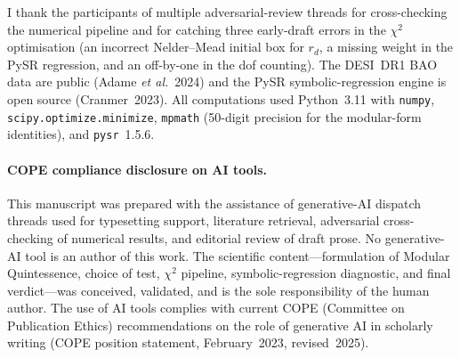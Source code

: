 \documentclass[11pt,letterpaper,twoside]{article}
\newcommand{\rd}{r_{d}}
\begin{document}
I thank the participants of multiple adversarial-review threads for cross-checking
the numerical pipeline and for catching three early-draft errors in the
$\chi^{2}$ optimisation (an incorrect Nelder--Mead initial box for $\rd$,
a missing weight in the PySR regression, and an off-by-one in the dof counting).
The DESI~DR1 BAO data are public (Adame \emph{et al.}~2024) and the PySR
symbolic-regression engine is open source (Cranmer~2023).
All computations used Python~3.11 with \texttt{numpy},
\texttt{scipy.optimize.minimize}, \texttt{mpmath} (50-digit precision for the
modular-form identities), and \texttt{pysr}~1.5.6.

\paragraph{COPE compliance disclosure on AI tools.}
This manuscript was prepared with the assistance of generative-AI dispatch
threads used for typesetting support, literature retrieval, adversarial
cross-checking of numerical results, and editorial review of draft prose.
No generative-AI tool is an author of this work.
The scientific content---formulation of Modular Quintessence, choice of test,
$\chi^{2}$ pipeline, symbolic-regression diagnostic, and final verdict---was
conceived, validated, and is the sole responsibility of the human author.
The use of AI tools complies with current COPE (Committee on Publication
Ethics) recommendations on the role of generative AI in scholarly writing
(COPE position statement, February~2023, revised~2025).
\end{document}
